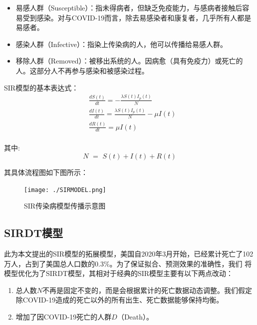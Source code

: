 \documentclass[bwprint]{gmcmthesis}
\numberwithin{figure}{section}
\begin{document}
\begin{itemize}
    \item 易感人群（Susceptible）：指未得病者，但缺乏免疫能力，与感病者接触后容易受到感染。对与COVID-19而言，除去易感染者和康复者，几乎所有人都是易感者。
    \item 感染人群（Infective）：指染上传染病的人，他可以传播给易感人群。
    \item 移除人群（Removed）：被移出系统的人。因病愈（具有免疫力）或死亡的人。这部分人不再参与感染和被感染过程。
\end{itemize}

SIR模型的基本表达式：
\begin{equation} \label{}
\begin{aligned}
        &\frac{dS\left( t \right)}{dt}=-\frac{\lambda S\left( t \right) I_p\left( t \right)}{N}\\
        &\frac{dI\left( t \right)}{dt}=\frac{\lambda S\left( t \right) I_p\left( t \right)}{N}-\mu I\left( t \right)\\
        &\frac{dR\left( t \right)}{dt}=\mu I\left( t \right)\\
\end{aligned}
\end{equation}

\par 其中:
\begin{equation} \label{}
    N\,\,=\,\,S\left( t \right) +I\left( t \right) +R\left( t \right) 
\end{equation}

\par 其具体流程图如下图所示：
\begin{figure}[!h]
\centering
\texttt{[image: ./SIRMODEL.png]}
\caption{SIR传染病模型传播示意图}
\label{fig1}
\end{figure}

\subsection{SIRDT模型}
\par 此为本文提出的SIR模型的拓展模型，美国自2020年3月开始，已经累计死亡了102万人，占到了美国总人口数的0.3$\%$。为了保证拟合、预测效果的准确性，我们
将模型优化为了SIRDT模型，其相对于经典的SIR模型主要有以下两点改动：

\begin{enumerate}
    \item 总人数$N$不再是固定不变的，而是会根据累计的死亡数据动态调整。我们假定除COVID-19造成的死亡以外的所有出生、死亡数据能够保持均衡。
    \item 增加了因COVID-19死亡的人群$D$（Death）。
\end{enumerate}
\end{document}
